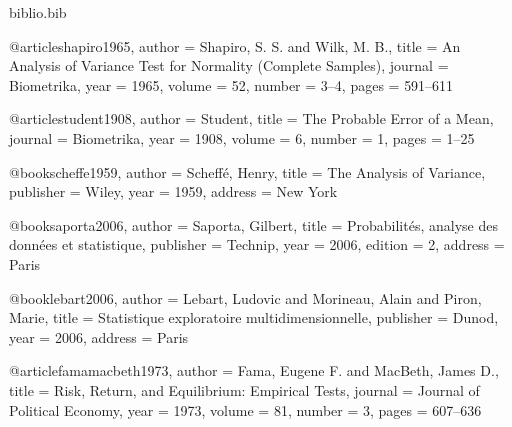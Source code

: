 %
\begin{filecontents*}[overwrite]{biblio.bib}

@article{shapiro1965,
  author  = {Shapiro, S. S. and Wilk, M. B.},
  title   = {An Analysis of Variance Test for Normality (Complete Samples)},
  journal = {Biometrika},
  year    = {1965},
  volume  = {52},
  number  = {3--4},
  pages   = {591--611}
}

@article{student1908,
  author  = {Student},
  title   = {The Probable Error of a Mean},
  journal = {Biometrika},
  year    = {1908},
  volume  = {6},
  number  = {1},
  pages   = {1--25}
}

@book{scheffe1959,
  author    = {Scheff{\'e}, Henry},
  title     = {The Analysis of Variance},
  publisher = {Wiley},
  year      = {1959},
  address   = {New York}
}

@book{saporta2006,
  author    = {Saporta, Gilbert},
  title     = {Probabilit{\'e}s, analyse des donn{\'e}es et statistique},
  publisher = {Technip},
  year      = {2006},
  edition   = {2},
  address   = {Paris}
}

@book{lebart2006,
  author    = {Lebart, Ludovic and Morineau, Alain and Piron, Marie},
  title     = {Statistique exploratoire multidimensionnelle},
  publisher = {Dunod},
  year      = {2006},
  address   = {Paris}
}


@article{famamacbeth1973,
  author  = {Fama, Eugene F. and MacBeth, James D.},
  title   = {Risk, Return, and Equilibrium: Empirical Tests},
  journal = {Journal of Political Economy},
  year    = {1973},
  volume  = {81},
  number  = {3},
  pages   = {607--636}
}


\end{filecontents*}
